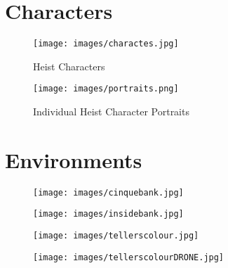 \documentclass[10pt]{report}
\begin{document}
\section{Characters}

\begin{figure}[H]
    \centering
	\texttt{[image: images/charactes.jpg]}
    \caption{Heist Characters}
\end{figure}

\begin{figure}[H]
    \centering
	\texttt{[image: images/portraits.png]}
    \caption{Individual Heist Character Portraits}
\end{figure}

\section{Environments}

\begin{figure}[H]
    \centering
	\texttt{[image: images/cinquebank.jpg]}
    \caption{}
\end{figure}

\begin{figure}[H]
    \centering
	\texttt{[image: images/insidebank.jpg]}
    \caption{}
\end{figure}

\begin{figure}[H]
    \centering
	\texttt{[image: images/tellerscolour.jpg]}
    \caption{}
\end{figure}

\begin{figure}[H]
    \centering
	\texttt{[image: images/tellerscolourDRONE.jpg]}
    \caption{}
\end{figure}
\end{document}

